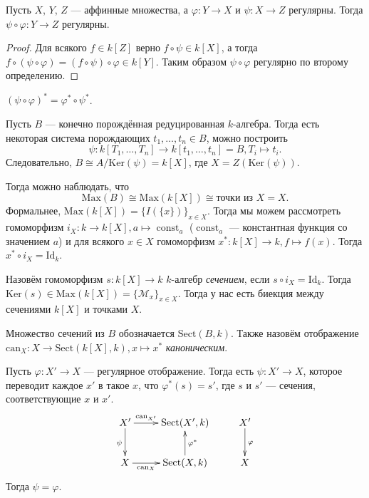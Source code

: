 \documentclass[12pt,a4paper]{article}
\DeclareMathOperator{\const}{const}
\newcommand{\Id}{\mathrm{Id}}
\newcommand{\Max}{\mathrm{Max}}
\newcommand{\Ker}{\mathrm{Ker}}
\newcommand{\Sect}{\mathrm{Sect}}
\newcommand{\can}{\mathrm{can}}
\begin{document}
    \begin{lemma}
        Пусть $X$, $Y$, $Z$ --- аффинные множества, а $\varphi: Y \to X$ и $\psi: X \to Z$ регулярны. Тогда $\psi \circ \varphi: Y \to Z$ регулярны.
    \end{lemma}

    \begin{proof}
        Для всякого $f \in k[Z]$ верно $f \circ \psi \in k[X]$, а тогда $f \circ (\psi \circ \varphi) = (f \circ \psi) \circ \varphi \in k[Y]$. Таким образом $\psi \circ \varphi$ регулярно по второму определению.
    \end{proof}

    \begin{remark*}
        $(\psi \circ \varphi)^* = \varphi^* \circ \psi^*$.
    \end{remark*}

    \begin{remark}
        Пусть $B$ --- конечно порождённая редуцированная $k$-алгебра. Тогда есть некоторая система порождающих $t_1, \dots, t_n \in B$, можно построить
        \[\psi: k[T_1, \dots, T_n] \to k[t_1, \dots, t_n] = B, T_i \mapsto t_i.\]
        Следовательно, $B \cong A/\Ker(\psi) = k[X]$, где $X = Z(\Ker(\psi))$.

        Тогда можно наблюдать, что
        \[\Max(B) \cong \Max(k[X]) \cong \text{точки из $X$} = X.\]
        Формальнее, $\Max(k[X]) = \{I(\{x\})\}_{x \in X}$. Тогда мы можем рассмотреть гомоморфизм $i_X: k \to k[X], a \mapsto \const_a$ ($\const_a$ --- константная функция со значением $a$) и для всякого $x \in X$ гомоморфизм $x^*: k[X] \to k, f \mapsto f(x)$. Тогда $x^* \circ i_X = \Id_k$.
    \end{remark}

    \begin{definition}
        Назовём гомоморфизм $s: k[X] \to k$ $k$-алгебр \emph{сечением}, если $s \circ i_X = \Id_k$. Тогда $\Ker(s) \in \Max(k[X]) = \{\mathcal{M}_x\}_{x \in X}$. Тогда у нас есть биекция между сечениями $k[X]$ и точками $X$.

        Множество сечений из $B$ обозначается $\Sect(B, k)$. Также назовём отображение $\can_X: X \to \Sect(k[X], k), x \mapsto x^*$ \emph{каноническим}.
    \end{definition}

    \begin{lemma}
        Пусть $\varphi: X' \to X$ --- регулярное отображение. Тогда есть $\psi: X' \to X$, которое переводит каждое $x'$ в такое $x$, что $\varphi^*(s) = s'$, где $s$ и $s'$ --- сечения, соответствующие $x$ и $x'$.
        \[
            \xymatrix{
                X' \ar[d]_{\psi} \ar[r]^(0.35){\can_{X'}}& \Sect(X', k)& X' \ar[d]^{\varphi}\\
                X \ar[r]_(0.35){\can_{X}}& \Sect(X, k) \ar[u]_{\varphi^*}& X\\
            }
        \]
        Тогда $\psi = \varphi$.
    \end{lemma}
\end{document}
